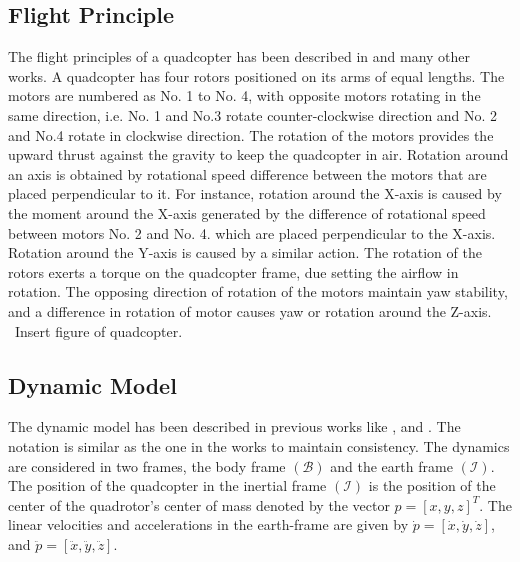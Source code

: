 \documentclass{article}
\begin{document}
\subsection{Flight Principle}
The flight principles of a quadcopter has been described in \cite{RN71} and many other works.
A quadcopter has four rotors positioned on its arms of equal lengths. The motors are numbered as No. 1 to No. 4, with opposite motors rotating in the same direction, i.e. No. 1 and No.3 rotate counter-clockwise direction and No. 2 and No.4 rotate in clockwise direction. The rotation of the motors provides the upward thrust against the gravity to keep the quadcopter in air. Rotation around an axis is obtained by rotational speed difference between the motors that are placed perpendicular to it. For instance, rotation around the X-axis is caused by the moment around the X-axis generated by the difference of rotational speed between motors No. 2 and No. 4. which are placed perpendicular to the X-axis. Rotation around the Y-axis is caused by a similar action. The rotation of the rotors exerts a torque on the quadcopter frame, due setting the airflow in rotation. The opposing direction of rotation of the motors maintain yaw stability, and a difference in rotation of motor causes yaw or rotation around the Z-axis.\\\ Insert figure of quadcopter.
\subsection{Dynamic Model}
The dynamic model has been described in previous works like \cite{hoffmann2007quadrotor}, \cite{zheng2014second} and \cite{alexis2012model}. The notation is similar as the one in the works to maintain consistency. 
The dynamics are considered in two frames, the body frame $(\mathcal{B})$ and the earth frame $(\mathcal{I})$. The position of the quadcopter in the inertial frame $(\mathcal{I})$ is the position of the center of the quadrotor's center of mass denoted by the vector $p=[x,y,z]^{T}$. The linear velocities and accelerations in the earth-frame are given by $\dot{p}=[\dot{x},\dot{y},\dot{z}]$, and $\ddot{p}=[\ddot{x},\ddot{y},\ddot{z}]$. 
\end{document}
